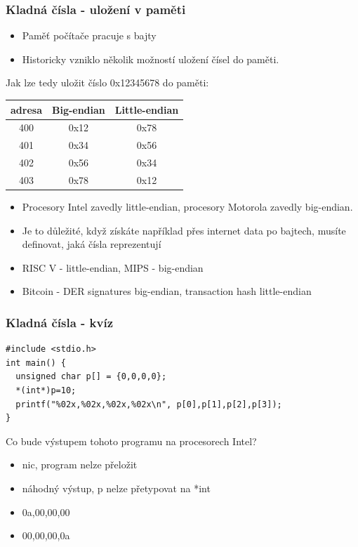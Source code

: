\begin{frame}
\frametitle{Kladná čísla - uložení v paměti}

\begin{itemize}
\item Paměť počítače pracuje s bajty
\item Historicky vzniklo několik možností uložení čísel do paměti.
\end{itemize}

Jak lze tedy uložit číslo 0x12345678 do paměti:
\begin{tabular}{|c|c|c|}\hline
adresa & Big-endian & Little-endian \\ \hline
400 & 0x12 & 0x78 \\ \hline
401 & 0x34 & 0x56 \\ \hline
402 & 0x56 & 0x34 \\ \hline
403 & 0x78 & 0x12 \\ \hline
\end{tabular}

\begin{itemize}
\item Procesory Intel zavedly little-endian, procesory Motorola zavedly big-endian.
\item Je to důležité, když získáte například přes internet data po bajtech, musíte definovat, jaká čísla reprezentují
\item RISC V - little-endian, MIPS - big-endian
\item Bitcoin - DER signatures big-endian, transaction hash little-endian
\end{itemize}
\end{frame}

\begin{frame}[fragile]
\frametitle{Kladná čísla - kvíz}
\begin{verbatim}
#include <stdio.h>
int main() {
  unsigned char p[] = {0,0,0,0};
  *(int*)p=10;
  printf("%02x,%02x,%02x,%02x\n", p[0],p[1],p[2],p[3]);
}
\end{verbatim}

Co bude výstupem tohoto programu na procesorech Intel?
\begin{itemize}
\item[A] nic, program nelze přeložit
\item[B] náhodný výstup, p  nelze přetypovat na *int
\item[C] 0a,00,00,00 
\item[D] 00,00,00,0a
\end{itemize}
\end{frame}



